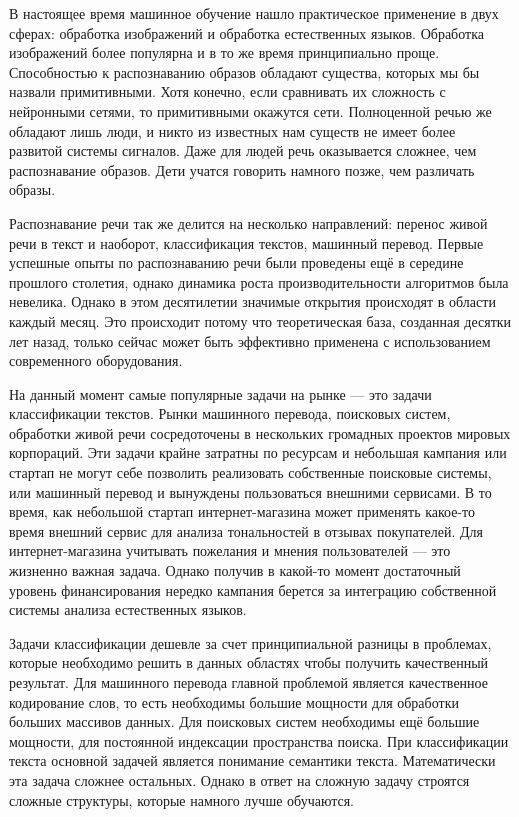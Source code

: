 \label{sec:intro}

В настоящее время машинное обучение нашло практическое применение в двух сферах: обработка изображений и обработка естественных языков. Обработка изображений более популярна и в то же время принципиально проще. Способностью к распознаванию образов обладают существа, которых мы бы назвали примитивными. Хотя конечно, если сравнивать их сложность с нейронными сетями, то примитивными окажутся сети. Полноценной речью же обладают лишь люди, и никто из известных нам существ не имеет более развитой системы сигналов. Даже для людей речь оказывается сложнее, чем распознавание образов. Дети учатся говорить намного позже, чем различать образы.

Распознавание речи так же делится на несколько направлений: перенос живой речи в текст и наоборот, классификация текстов, машинный перевод. Первые успешные опыты по распознаванию речи были проведены ещё в середине прошлого столетия, однако динамика роста производительности алгоритмов была невелика. Однако в этом десятилетии значимые открытия происходят в области каждый месяц. Это происходит потому что теоретическая база, созданная десятки лет назад, только сейчас может быть эффективно применена с использованием современного оборудования.

На данный момент самые популярные задачи на рынке --- это задачи классификации текстов. Рынки машинного перевода, поисковых систем, обработки живой речи сосредоточены в нескольких громадных проектов мировых корпораций. Эти задачи крайне затратны по ресурсам и небольшая кампания или стартап не могут себе позволить реализовать собственные поисковые системы, или машинный перевод и вынуждены пользоваться внешними сервисами. В то время, как небольшой стартап интернет-магазина может применять какое-то время внешний сервис для анализа тональностей в отзывах покупателей. Для интернет-магазина учитывать пожелания и мнения пользователей --- это жизненно важная задача. Однако получив в какой-то момент достаточный уровень финансирования нередко кампания берется за интеграцию собственной системы анализа естественных языков.

Задачи классификации дешевле за счет принципиальной разницы в проблемах, которые необходимо решить в данных областях чтобы получить качественный результат. Для машинного перевода главной проблемой является качественное кодирование слов, то есть необходимы большие мощности для обработки больших массивов данных. Для поисковых систем необходимы ещё большие мощности, для постоянной индексации пространства поиска. При классификации текста основной задачей является понимание семантики текста. Математически эта задача сложнее остальных. Однако в ответ на сложную задачу строятся сложные структуры, которые намного лучше обучаются.


